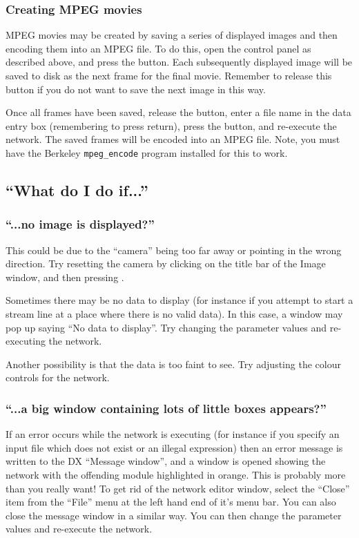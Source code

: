 \subsubsection{Creating MPEG movies}
MPEG movies may be created by saving a series of displayed images and
then encoding them into an MPEG file. To do this, open the  control panel as described above, and press the
 button. Each subsequently displayed image will be
saved to disk as the next frame for the final movie. Remember to release
this button if you do not want to save the next image in this way.

Once all frames have been saved, release the  button,
enter a file name in the  data entry box
(remembering to press return), press the 
button, and re-execute the network. The saved frames will be encoded into
an MPEG file. Note, you must have the Berkeley {\tt mpeg\_encode} program
installed for this to work.

\subsection{``What do I do if...''}
\subsubsection{``...no image is displayed?''}
This could be due to the ``camera'' being too far away or pointing in
the wrong direction. Try resetting the camera by clicking on the title
bar of the Image window, and then pressing {\tt <control-F>}.

Sometimes there may be no data to display (for instance if you attempt to
start a stream line at a place where there is no valid data). In this
case, a window may pop up saying ``No data to display''. Try changing
the parameter values and re-executing the network.

Another possibility is that the data is too faint to see. Try adjusting
the colour controls for the network.

\subsubsection{``...a big window containing lots of little boxes appears?''}
If an error occurs while the network is executing (for instance if you
specify an input file which does not exist or an illegal 
expression) then an error message is
written to the DX ``Message window'', and a window is opened showing the
network with the offending module highlighted in orange. This is probably
more than you really want! To get rid of the network editor window,
select the ``Close'' item from the ``File'' menu at the left hand end of
it's menu bar. You can also close the message window in a similar way.
You can then change the parameter values and re-execute the network.

